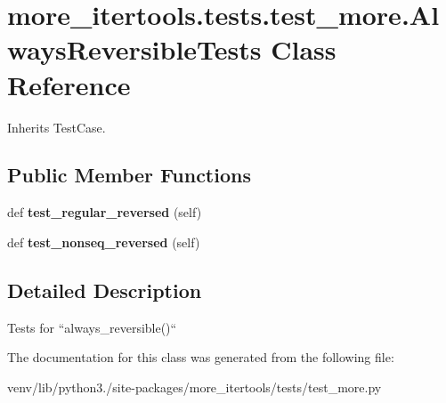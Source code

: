 \hypertarget{classmore__itertools_1_1tests_1_1test__more_1_1_always_reversible_tests}{}\section{more\+\_\+itertools.\+tests.\+test\+\_\+more.\+Always\+Reversible\+Tests Class Reference}
\label{classmore__itertools_1_1tests_1_1test__more_1_1_always_reversible_tests}


Inherits Test\+Case.

\subsection*{Public Member Functions}
\begin{DoxyCompactItemize}
\item 
\mbox{\label{classmore__itertools_1_1tests_1_1test__more_1_1_always_reversible_tests_a18a40c4776c2d9e794af2559ceb1f6b6}} 
def {\bfseries test\+\_\+regular\+\_\+reversed} (self)
\item 
\mbox{\label{classmore__itertools_1_1tests_1_1test__more_1_1_always_reversible_tests_a4889275069268d32a99ba8f954517f40}} 
def {\bfseries test\+\_\+nonseq\+\_\+reversed} (self)
\end{DoxyCompactItemize}


\subsection{Detailed Description}
\begin{DoxyVerb}Tests for ``always_reversible()``\end{DoxyVerb}
 

The documentation for this class was generated from the following file\+:\begin{DoxyCompactItemize}
\item 
venv/lib/python3./site-\/packages/more\+\_\+itertools/tests/test\+\_\+more.\+py\end{DoxyCompactItemize}
